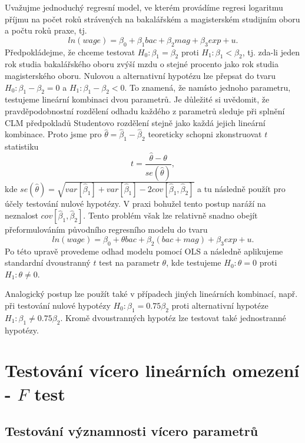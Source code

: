 Uvažujme jednoduchý regresní model, ve kterém provádíme regresi logaritmu příjmu na počet roků strávených na bakalářském a magisterském 
studijním oboru a počtu roků praxe, tj.
\begin{equation}
ln(wage) = \beta_0 + \beta_1 bac + \beta_2 mag + \beta_3 exp + u.
\end{equation}
Předpokládejme, že chceme testovat $H_0: \beta_1 = \beta_2$ proti $H_1: \beta_1 < \beta_2$, tj. zda-li jeden rok studia bakalářského oboru 
zvýší mzdu o stejné procento jako rok studia magisterského oboru. Nulovou a alternativní hypotézu lze přepsat do tvaru $H_0: \beta_1 - 
\beta_2 = 0$ a $H_1: \beta_1 - \beta_2 < 0$. To znamená, že namísto jednoho parametru, testujeme lineární kombinaci dvou parametrů. Je 
důležité si uvědomit, že pravděpodobnostní rozdělení odhadu každého z parametrů sleduje při splnění CLM předpokladů Studentovo 
rozdělení stejně jako každá jejich lineární kombinace. Proto jsme pro $\hat{\theta} = \hat{\beta}_1 - \hat{\beta}_2$ teoreticky schopni zkonstruovat $t$ statistiku
\begin{equation}
t = \frac{\hat{\theta} - \theta}{se(\hat{\theta})},
\end{equation}
kde $se(\hat{\theta}) = \sqrt{var[\hat{\beta}_1] + var[\hat{\beta}_1] - 2cov[\hat{\beta}_1, \hat{\beta}_2]}$ a tu následně použít pro účely 
testování nulové hypotézy. V praxi bohužel tento postup naráží na neznalost $cov[\hat{\beta}_1, \hat{\beta}_2]$. Tento problém však lze 
relativně snadno obejít přeformulováním původního regresního modelu do tvaru
\begin{equation}
ln(wage) = \beta_0 + \theta bac + \beta_2 (bac + mag) + \beta_3 exp + u.
\end{equation}
Po této upravě provedeme odhad modelu pomocí OLS a následně aplikujeme standardní dvoustranný $t$ test na parametr $\theta$, kde testujeme 
$H_0: \theta = 0$ proti $H_1: \theta \ne 0$.

Analogický postup lze použít také v případech jiných lineárních kombinací, např. při 
testování nulové hypotézy $H_0: \beta_1 = 0.75 \beta_2$ proti alternativní hypotéze $H_1: \beta_1 \ne 0.75 \beta_2$. Kromě dvoustranných 
hypotéz lze testovat také jednostranné hypotézy.

\section{Testování vícero lineárních omezení - $F$ test}

\subsection{Testování významnosti vícero parametrů}

